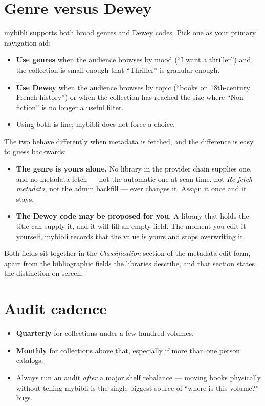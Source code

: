 \section{Genre versus Dewey}

mybibli supports both broad genres and Dewey codes.
Pick one as your primary navigation aid:

\begin{itemize}
  \item \textbf{Use genres} when the audience browses by mood
        (``I want a thriller'') and the collection is small enough
        that ``Thriller'' is granular enough.
  \item \textbf{Use Dewey} when the audience browses by topic
        (``books on 18th-century French history'') or when the
        collection has reached the size where ``Non-fiction'' is no
        longer a useful filter.
  \item Using both is fine; mybibli does not force a choice.
\end{itemize}

The two behave differently when metadata is fetched, and the
difference is easy to guess backwards:

\begin{itemize}
  \item \textbf{The genre is yours alone.} No library in the provider
        chain supplies one, and no metadata fetch \string— not the
        automatic one at scan time, not \emph{Re-fetch metadata}, not
        the admin backfill \string— ever changes it. Assign it once and
        it stays.
  \item \textbf{The Dewey code may be proposed for you.} A library
        that holds the title can supply it, and it will fill an empty
        field. The moment you edit it yourself, mybibli records that
        the value is yours and stops overwriting it.
\end{itemize}

Both fields sit together in the \emph{Classification} section of the
metadata-edit form, apart from the bibliographic fields the libraries
describe, and that section states the distinction on screen.

\section{Audit cadence}

\begin{itemize}
  \item \textbf{Quarterly} for collections under a few hundred
        volumes.
  \item \textbf{Monthly} for collections above that, especially if
        more than one person catalogs.
  \item Always run an audit \emph{after} a major shelf rebalance —
        moving books physically without telling mybibli is the
        single biggest source of ``where is this volume?'' bugs.
\end{itemize}

